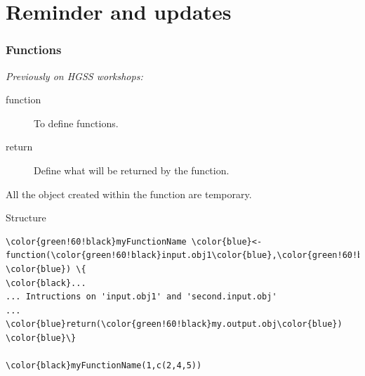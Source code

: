 \documentclass[10pt]{beamer}
\newenvironment{xframe}[2][]
  {\begin{frame}[fragile,environment=xframe,#1]
  \frametitle{#2}}
  {\end{frame}}
\begin{document}



\section{Reminder and updates}

\begin{xframe}{Functions}
  {\it\small Previously on HGSS workshops: }
  \begin{block}{}
    \begin{description}
      \item[function] To define functions.
      \item[return] Define what will be returned by the function. 
    \end{description}
    All the object created within the function are temporary.
    \bigskip
    \end{block}
    \begin{block}{Structure}    
\begin{Verbatim}[commandchars=\\\{\}]
\color{green!60!black}myFunctionName \color{blue}<- function(\color{green!60!black}input.obj1\color{blue},\color{green!60!black}second.input.obj \color{blue}) \{
\color{black}...
... Intructions on 'input.obj1' and 'second.input.obj'
...
\color{blue}return(\color{green!60!black}my.output.obj\color{blue})
\color{blue}\}

\color{black}myFunctionName(1,c(2,4,5))
\end{Verbatim}
  \end{block}
\end{xframe}
\end{document}
